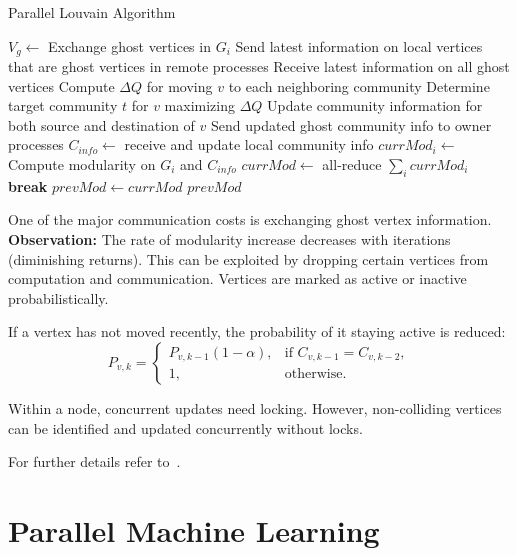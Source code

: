 \documentclass[12pt]{book}
\begin{document}
\begin{algorithm}[H]
\caption{Parallel Louvain Algorithm}
\label{alg:louvain-parallel}
\begin{algorithmic}[1]
    \State $V_g \gets$ Exchange ghost vertices in $G_i$
        \State Send latest information on local vertices that are ghost vertices in remote processes
        \State Receive latest information on all ghost vertices
            \State Compute $\Delta Q$ for moving $v$ to each neighboring community
            \State Determine target community $t$ for $v$ maximizing $\Delta Q$
            \State Update community information for both source and destination of $v$
            \State Send updated ghost community info to owner processes
            \State $C_{info} \gets$ receive and update local community info
        \EndFor
        \State $currMod_i \gets$ Compute modularity on $G_i$ and $C_{info}$
        \State $currMod \gets$ all-reduce $\sum_i currMod_i$
            \State \textbf{break}
        \EndIf
        \State $prevMod \gets currMod$
    \EndWhile
    \State \Return $prevMod$
\EndFunction
\end{algorithmic}
\end{algorithm}

One of the major communication costs is exchanging ghost vertex information.  
\textbf{Observation:} The rate of modularity increase decreases with iterations (diminishing returns). This can be exploited by dropping certain vertices from computation and communication. Vertices are marked as active or inactive probabilistically.

If a vertex has not moved recently, the probability of it staying active is reduced:
\[
P_{v,k} = 
\begin{cases}
    P_{v,k-1}(1-\alpha), & \text{if } C_{v,k-1} = C_{v,k-2}, \\
    1, & \text{otherwise}.
\end{cases}
\]

Within a node, concurrent updates need locking. However, non-colliding vertices can be identified and updated concurrently without locks.  

For further details refer to~\cite{ghosh2018distributed}.

\section{Parallel Machine Learning}
\end{document}
